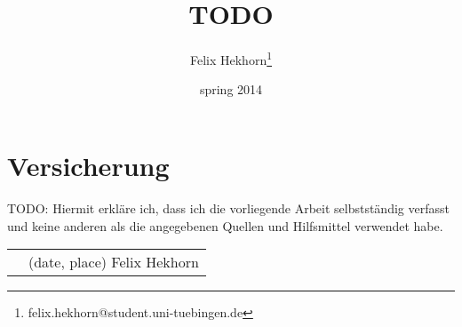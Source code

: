 \documentclass[
  ngerman,english,		%
  a4paper,		%
  11pt,			%
  DIV=12,
  titlepage,
  toc=bibnumbered,
  parskip=full,  	%
  headings=normal,
  BCOR10mm
]{scrreprt}
\title{TODO}
\author{Felix Hekhorn\footnote{felix.hekhorn@student.uni-tuebingen.de}}
\date{spring 2014}
\begin{document}
\maketitle

\tableofcontents

\newpage





\appendix





\begingroup
\let\clearpage\relax
\chapter{Versicherung}
TODO: Hiermit erkläre ich, dass ich die vorliegende Arbeit selbstständig verfasst und keine anderen als die angegebenen Quellen und Hilfsmittel verwendet habe.

\vspace{3cm}
\begin{tabularx}{\linewidth}{X p{10cm}}\cline{2-2}
& (date, place) Felix Hekhorn
\end{tabularx}
\endgroup
\end{document}
